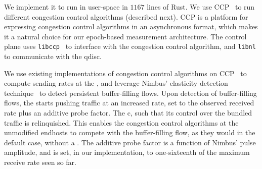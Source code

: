 
 We implement it to run in user-space in $1167$ lines of Rust.
We use CCP~\cite{ccp} to run different congestion control algorithms (described next). CCP is a platform for expressing congestion control algorithms in an asynchronous format, which makes it a natural choice for our epoch-based measurement architecture. The control plane uses \texttt{libccp}~\cite{ccp} to interface with the congestion control algorithm, and  \texttt{libnl} to communicate with the qdisc.

 We use existing implementations of congestion control algorithms on CCP~\cite{nimbus, copa, bbr} to compute sending rates at the \inbox, and leverage Nimbus' elasticity detection technique~\cite{nimbus} to detect persistent buffer-filling flows. Upon detection of buffer-filling flows, the \inbox  starts pushing traffic at an increased rate, set to the observed received rate plus an additive probe factor. The c, such that its control over the bundled traffic is relinquished. This enables the congestion control algorithms at the unmodified endhosts to compete with the buffer-filling flow, as they would in the default case, without a \name. The additive probe factor is a function of Nimbus' pulse amplitude, and is set, in our implementation, to one-sixteenth of the maximum receive rate seen so far.



